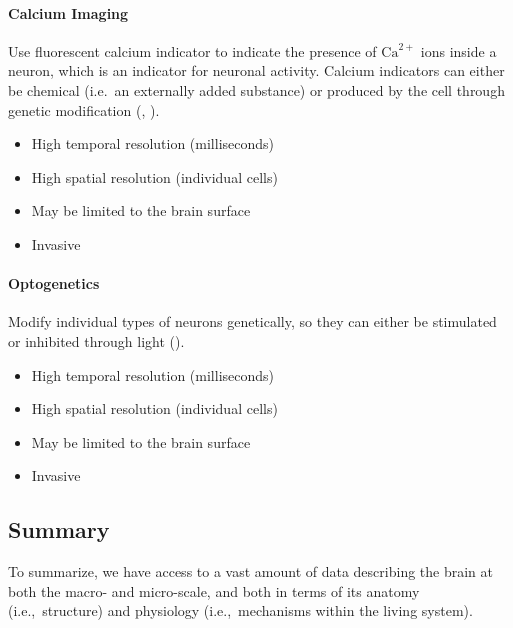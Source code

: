 \documentclass[10pt,letterpaper,oneside]{article}
\begin{document}
\paragraph{Calcium Imaging}
Use fluorescent calcium indicator to indicate the presence of $\mathrm{Ca}^{2+}$ ions inside a neuron, which is an indicator for neuronal activity. Calcium indicators can either be chemical (i.e.~an externally added substance) or produced by the cell through genetic modification (, ).
\begin{multicols}{2}
	\begin{itemize}
		\item[\OPlus] High temporal resolution (milliseconds)
		\item[\OPlus] High spatial resolution (individual cells)
	\end{itemize}
	\columnbreak
	\begin{itemize}
		\item[\OMinus] May be limited to the brain surface
		\item[\OMinus] Invasive
	\end{itemize}
\end{multicols}

\paragraph{Optogenetics}
Modify individual types of neurons genetically, so they can either be stimulated or inhibited through light ().
\begin{multicols}{2}
	\begin{itemize}
		\item[\OPlus] High temporal resolution (milliseconds)
		\item[\OPlus] High spatial resolution (individual cells)
	\end{itemize}
	\columnbreak
	\begin{itemize}
		\item[\OMinus] May be limited to the brain surface
		\item[\OMinus] Invasive
	\end{itemize}
\end{multicols}

\subsection{Summary}

To summarize, we have access to a vast amount of data describing the brain at both the macro- and micro-scale, and both in terms of its anatomy (i.e.,~structure) and physiology (i.e.,~mechanisms within the living system).
\end{document}
